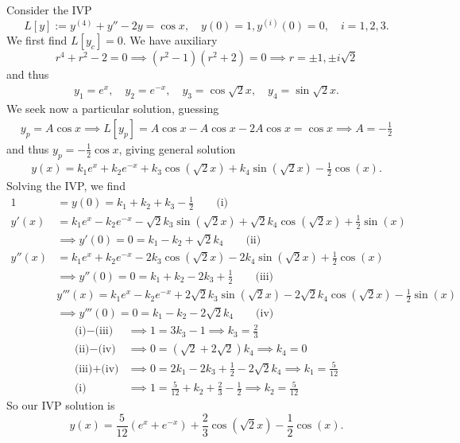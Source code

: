 \begin{example}
    Consider the IVP \[
    L[y]:=y^{(4)} + y'' - 2y = \cos x, \quad y(0) = 1, y^{(i)}(0) = 0,\quad  i = 1, 2, 3.    
    \]
    We first find $L[y_c] = 0$. We have auxiliary \[
    r^4 + r^2 - 2 = 0 \implies (r^2 - 1)(r^2 + 2)  = 0 \implies r = \pm 1, \pm i\sqrt{2}
    \]
    and thus \begin{align*}
        y_1 = e^x, \quad y_2 = e^{-x}, \quad y_3 = \cos \sqrt{2} x, \quad y_4 = \sin \sqrt{2} x.
    \end{align*}
    We seek now a particular solution, guessing \begin{align*}
        y_p = A \cos x \implies L[y_p] = A \cos x - A \cos x - 2A \cos x = \cos x \implies A = - \frac{1}{2}
    \end{align*}
    and thus $y_p = - \frac{1}{2} \cos x$, giving general solution \begin{align*}
        y(x) = k_1e^x + k_2e^{-x} + k_3 \cos (\sqrt{2}x) + k_4 \sin (\sqrt{2} x) - \frac{1}{2} \cos (x).
    \end{align*}
    Solving the IVP, we find \begin{align*}
        1 &= y(0) = k_1 + k_2 + k_3 - \frac{1}{2}\qquad \text{(i)}\\
        y'(x) &=k_1e^x - k_2e^{-x} - \sqrt{2}k_3 \sin(\sqrt{2}x) + \sqrt{2}k_4\cos (\sqrt{2} x) + \frac{1}{2}\sin(x)\\
        &\implies y'(0)= 0  = k_1 - k_2 + \sqrt{2}k_4 \qquad \text{(ii)}\\
        y''(x) &= k_1 e^{x} + k_2e^{-x} - 2k_3 \cos (\sqrt{2}x) - 2k_4 \sin(\sqrt{2}x) + \frac{1}{2} \cos (x)\\
        &\implies y''(0) = 0 = k_1 + k_2 - 2k_3 + \frac{1}{2} \qquad \text{(iii)}\\
        &y'''(x) = k_1e^x - k_2e^{-x} + 2 \sqrt{2}k_3 \sin( \sqrt{2}x) - 2 \sqrt{2}k_4 \cos(\sqrt{2} x) - \frac{1}{2}\sin(x)\\
        &\implies y'''(0) = 0 = k_1 - k_2 - 2 \sqrt{2}k_4 \qquad \text{(iv)}
    \end{align*}
    \begin{align*}
        \text{(i)} - \text{(iii)} &\implies 1 = 3k_3 - 1 \implies k_3 = \frac{2}{3}\\
        \text{(ii)} - \text{(iv)} &\implies 0 = (\sqrt{2} + 2 \sqrt{2})k_4 \implies k_4 = 0\\
        \text{(iii)} + \text{(iv)} &\implies 0 = 2k_1 - 2k_3 + \frac{1}{2} - 2 \sqrt{2}k_4 \implies k_1 =  \frac{5}{12}\\
        \text{(i)} &\implies 1 = \frac{5}{12} + k_2 + \frac{2}{3} - \frac{1}{2} \implies k_2 = \frac{5}{12}
    \end{align*}
    So our IVP solution is \[
    y(x) = \frac{5}{12}(e^{x}+e^{-x})+ \frac{2}{3}\cos(\sqrt{2}x) - \frac{1}{2} \cos(x).
    \]
\end{example}

